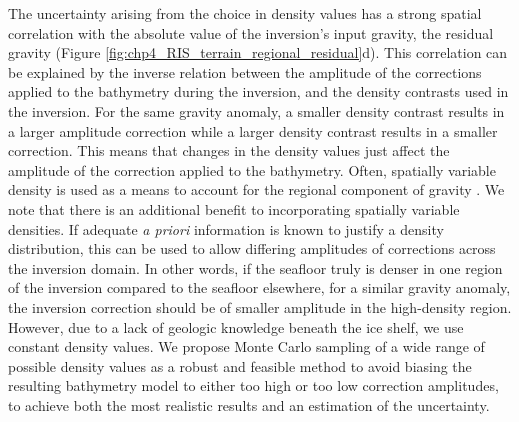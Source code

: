 The uncertainty arising from the choice in density values has a strong spatial correlation with the absolute value of the inversion's input gravity, the residual gravity (Figure \ref{fig:chp4_RIS_terrain_regional_residual}d). This correlation can be explained by the inverse relation between the amplitude of the corrections applied to the bathymetry during the inversion, and the density contrasts used in the inversion. For the same gravity anomaly, a smaller density contrast results in a larger amplitude correction while a larger density contrast results in a smaller correction. This means that changes in the density values just affect the amplitude of the correction applied to the bathymetry. Often, spatially variable density is used as a means to account for the regional component of gravity \citep[e.g.,][]{tintoross2019, constantinoseafloor2020}. We note that there is an additional benefit to incorporating spatially variable densities. If adequate \textit{a priori} information is known to justify a density distribution, this can be used to allow differing amplitudes of corrections across the inversion domain. In other words, if the seafloor truly is denser in one region of the inversion compared to the seafloor elsewhere, for a similar gravity anomaly, the inversion correction should be of smaller amplitude in the high-density region. However, due to a lack of geologic knowledge beneath the ice shelf, we use constant density values. We propose Monte Carlo sampling of a wide range of possible density values as a robust and feasible method to avoid biasing the resulting bathymetry model to either too high or too low correction amplitudes, to achieve both the most realistic results and an estimation of the uncertainty.\\

